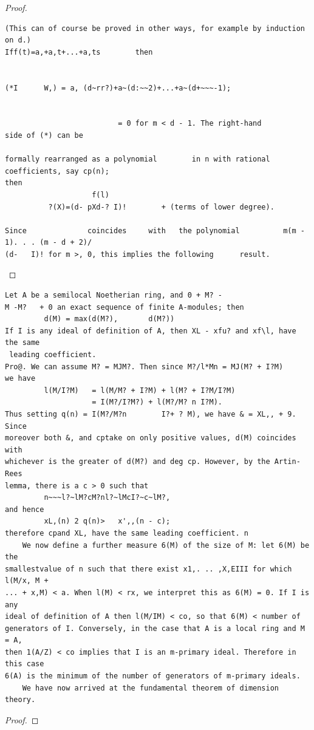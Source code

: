 \begin{proof}
\begin{verbatim}
(This can of course be proved in other ways, for example by induction on d.)
Iff(t)=a,+a,t+...+a,ts        then


(*I      W,) = a, (d~rr?)+a~(d:~~2)+...+a~(d+~~~-1);


                          = 0 for m < d - 1. The right-hand            side of (*) can be

formally rearranged as a polynomial        in n with rational coefficients, say cp(n);
then
                    f(l)
          ?(X)=(d- pXd-? I)!        + (terms of lower degree).

Since              coincides     with   the polynomial          m(m - 1). . . (m - d + 2)/
(d-   I)! for m >, 0, this implies the following      result.
\end{verbatim}
\end{proof}


\begin{theorem}\label{mcrt-auto-theorem-13-3}\uses{}
\begin{verbatim}
Let A be a semilocal Noetherian ring, and 0 + M? -
M -M?   + 0 an exact sequence of finite A-modules; then
         d(M) = max(d(M?),       d(M?))
If I is any ideal of definition of A, then XL - xfu? and xf\l, have the same
 leading coefficient.
Pro@. We can assume M? = MJM?. Then since M?/l*Mn = MJ(M? + I?M)
we have
         l(M/I?M)   = l(M/M? + I?M) + l(M? + I?M/I?M)
                    = I(M?/I?M?) + l(M?/M? n I?M).
Thus setting q(n) = I(M?/M?n        I?+ ? M), we have & = XL,, + 9. Since
moreover both &, and cptake on only positive values, d(M) coincides with
whichever is the greater of d(M?) and deg cp. However, by the Artin-Rees
lemma, there is a c > 0 such that
         n~~~l?~lM?cM?nl?~lMcI?~c~lM?,
and hence
         xL,(n) 2 q(n)>   x',,(n - c);
therefore cpand XL, have the same leading coefficient. n
    We now define a further measure 6(M) of the size of M: let 6(M) be the
smallestvalue of n such that there exist x1,. .. ,X,EIII for which l(M/x, M +
... + x,M) < a. When l(M) < rx, we interpret this as 6(M) = 0. If I is any
ideal of definition of A then l(M/IM) < co, so that 6(M) < number of
generators of I. Conversely, in the case that A is a local ring and M = A,
then 1(A/Z) < co implies that I is an m-primary ideal. Therefore in this case
6(A) is the minimum of the number of generators of m-primary ideals.
    We have now arrived at the fundamental theorem of dimension theory.
\end{verbatim}
\end{theorem}
\begin{proof}
\notready
\end{proof}


